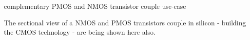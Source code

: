 \begin{center}
    complementary PMOS and NMOS transistor couple use-case
    \begin{figure}[h] %
        \centering
        \begin{circuitdiagram}{20}{20}
        \end{circuitdiagram}
    \end{figure}
\end{center}

The sectional view of a NMOS and PMOS transistors couple in silicon - building the CMOS technology - are being shown here also.

\clearpage
